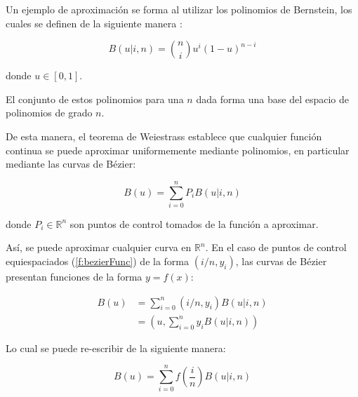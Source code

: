 
Un ejemplo de aproximaci\'on se forma al utilizar los polinomios de Bernstein, los cuales se definen de la siguiente manera \citep{goldman_pyramid_2002,phillips_interpolation_2003,mann_blossoming_2006,de_villiers_mathematics_2012}:

\begin{equation}
	B(u|i,n) = \binom{n}{i} u^i (1-u)^{n-i}
\end{equation}

\noindent
donde $u \in [0,1]$.

El conjunto de estos polinomios para una $n$ dada forma una base del espacio de polinomios de grado $n$. 

De esta manera, el teorema de Weiestrass establece que cualquier funci\'on continua se puede aproximar uniformemente mediante polinomios, en particular mediante las curvas de B\'ezier:

\begin{equation}
	B(u) = \sum_{i=0}^n P_i B(u|i,n)
\end{equation}

\noindent
donde $P_i \in \mathbb{R}^n$ son puntos de control tomados de la funci\'on a aproximar.

As\'i, se puede aproximar cualquier curva en $\mathbb{R}^n$. En el caso de puntos de control equiespaciados (\autoref{f:bezierFunc}) de la forma $(i/n, y_i)$, las curvas de B\'ezier presentan funciones de la forma $y = f(x)$:

\begin{align}
	B(u) &= \sum_{i=0}^n (i/n, y_i) B(u|i,n) \\
      &=  \left( u, \sum_{i=0}^n y_i B(u|i,n) \right)
\end{align}

Lo cual se puede re-escribir de la siguiente manera:

\begin{equation}
	B(u) = \sum_{i=0}^n
	f
	\left(
		\frac{i}{n}
	\right)
	B(u|i,n)
\end{equation}	

